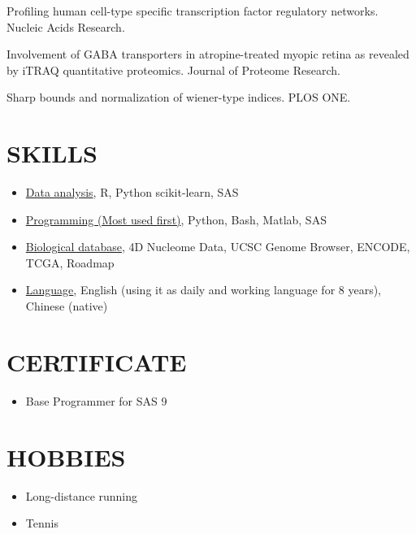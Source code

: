 \documentclass[paper=letter,fontsize=10pt]{scrartcl} %
\newlength{\spacebox}
\newcommand{\NewPart}[2]{\section*{\uppercase{#1} #2}}
\newcommand{\PersonalEntry}[2]{
		\noindent\hangindent=2em\hangafter=0 %
		\parbox{\spacebox}{        %
		\textit{#1}}		       %
		\hspace{1.5em} #2 \par}    %
\newcommand{\SkillsEntry}[2]{      %
    \noindent \underline{#1}, #2 \par }
\newcommand{\TeachEntry}[1]{      %
    \noindent #1 \par }
\newcommand{\PaperEntry}[7]{
		\noindent #2. #3.}
\begin{document}
\begin{etaremune}
\item \PaperEntry{Zhang S$^\star$, \textbf{Tian D}$^\star$,  Tran N.H, Choi K.P, and Zhang L.X}{Profiling human cell-type specific transcription factor regulatory networks}{Nucleic Acids Research}{42}{20}{2014}{https://academic.oup.com/nar/article/42/20/12380/2902979}  
\item \PaperEntry{Barathi V.A, Chaurasia S.S, Poidinger M, Koh S.K, \textbf{Tian D}, Ho C, Iuvone P.M, Beuerman R.W, Zhou L}{Involvement of GABA transporters in atropine-treated myopic retina as revealed by iTRAQ quantitative proteomics}{Journal of Proteome Research}{13}{11}{2014}{https://pubs.acs.org/doi/abs/10.1021/pr500558y}
\item \PaperEntry{\textbf{Tian D} and Choi K.P}{Sharp bounds and normalization of wiener-type indices}{PLOS ONE}{8}{11}{2013}{https://journals.plos.org/plosone/article?id=10.1371/journal.pone.0078448}
\end{etaremune}


\NewPart{Skills}{}
\begin{itemize}
    \item \SkillsEntry{Data analysis}{R, Python scikit-learn, SAS}
    \item \SkillsEntry{Programming (Most used first)}{Python, Bash, Matlab, SAS}
    \item \SkillsEntry{Biological database}{4D Nucleome Data, UCSC Genome Browser, ENCODE, TCGA, Roadmap }
    \item \SkillsEntry{Language}{English (using it as daily and working language for 8 years), Chinese (native)}
\end{itemize}

\NewPart{Certificate}{}
\begin{itemize}
\item Base Programmer for SAS 9
\end{itemize}

\NewPart{Hobbies}{}

\begin{itemize}
    \item Long-distance running
    \item Tennis
\end{itemize}
\end{document}

